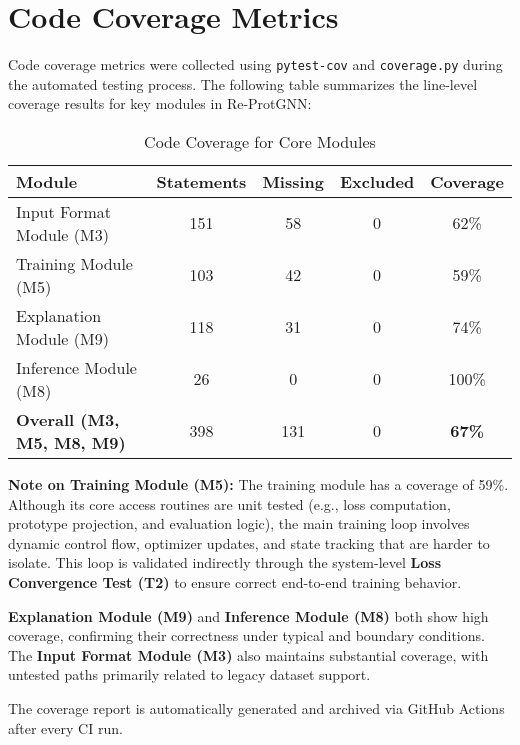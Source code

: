 \documentclass[12pt, titlepage]{article}
\begin{document}
\section{Code Coverage Metrics}

Code coverage metrics were collected using \texttt{pytest-cov} and \texttt{coverage.py} during the automated testing process. The following table summarizes the line-level coverage results for key modules in Re-ProtGNN:

\begin{table}[h!]
  \centering
  \begin{tabular}{|l|c|c|c|c|}
  \hline
  \textbf{Module} & \textbf{Statements} & \textbf{Missing} & \textbf{Excluded} & \textbf{Coverage} \\
  \hline
  Input Format Module (M3)     & 151 & 58  & 0 & 62\% \\
  \hline
  Training Module (M5)         & 103 & 42  & 0 & 59\% \\
  \hline
  Explanation Module (M9)      & 118 & 31  & 0 & 74\% \\
  \hline
  Inference Module (M8)        & 26  & 0   & 0 & 100\% \\
  \hline
  \textbf{Overall (M3, M5, M8, M9)} & 398 & 131 & 0 & \textbf{67\%} \\
  \hline
  \end{tabular}
  \caption{Code Coverage for Core Modules}
  \label{Table:coverage}
\end{table}

\noindent \textbf{Note on Training Module (M5):}  
The training module has a coverage of 59\%. Although its core access routines are unit tested (e.g., loss computation, prototype projection, and evaluation logic), the main training loop involves dynamic control flow, optimizer updates, and state tracking that are harder to isolate. This loop is validated indirectly through the system-level \textbf{Loss Convergence Test (T2)} to ensure correct end-to-end training behavior.

\vspace{1em}
\noindent \textbf{Explanation Module (M9)} and \textbf{Inference Module (M8)} both show high coverage, confirming their correctness under typical and boundary conditions. The \textbf{Input Format Module (M3)} also maintains substantial coverage, with untested paths primarily related to legacy dataset support.

\vspace{1em}
\noindent The coverage report is automatically generated and archived via GitHub Actions after every CI run.




%
\end{document}
